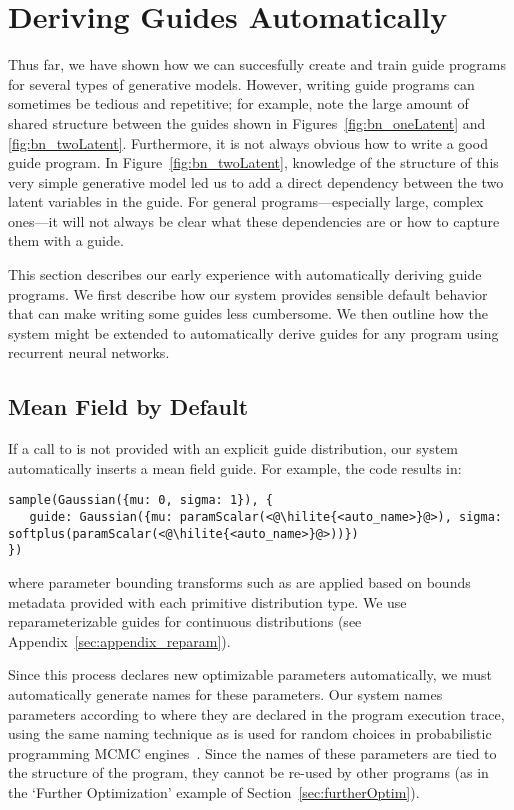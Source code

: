 \section{Deriving Guides Automatically}
\label{sec:autoGuide}

Thus far, we have shown how we can succesfully create and train guide programs for several types of generative models. However, writing guide programs can sometimes be tedious and repetitive; for example, note the large amount of shared structure between the guides shown in Figures~\ref{fig:bn_oneLatent} and \ref{fig:bn_twoLatent}. Furthermore, it is not always obvious how to write a good guide program. In Figure~\ref{fig:bn_twoLatent}, knowledge of the structure of this very simple generative model led us to add a direct dependency between the two latent variables in the guide. For general programs---especially large, complex ones---it will not always be clear what these dependencies are or how to capture them with a guide.

This section describes our early experience with automatically deriving guide programs. We first describe how our system provides sensible default behavior that can make writing some guides less cumbersome. We then outline how the system might be extended to automatically derive guides for any program using recurrent neural networks.

\subsection{Mean Field by Default}

If a call to  is not provided with an explicit guide distribution, our system automatically inserts a mean field guide. For example, the code  results in:
\begin{lstlisting}
sample(Gaussian({mu: 0, sigma: 1}), {
   guide: Gaussian({mu: paramScalar(<@\hilite{<auto_name>}@>), sigma: softplus(paramScalar(<@\hilite{<auto_name>}@>))})
})
\end{lstlisting}
where parameter bounding transforms such as  are applied based on bounds metadata provided with each primitive distribution type. We use reparameterizable guides for continuous distributions (see Appendix~\ref{sec:appendix_reparam}).

Since this process declares new optimizable parameters automatically, we must automatically generate names for these parameters. Our system names parameters according to where they are declared in the program execution trace, using the same naming technique as is used for random choices in probabilistic programming MCMC engines~\cite{Lightweight}. Since the names of these parameters are tied to the structure of the program, they cannot be re-used by other programs (as in the `Further Optimization' example of Section~\ref{sec:furtherOptim}).

